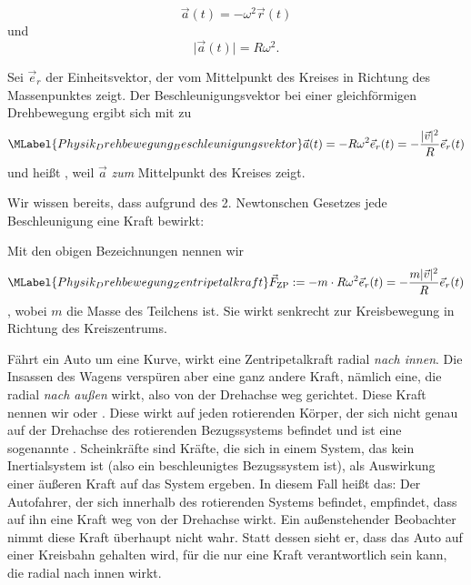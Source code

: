 \begin{MContent}
             $$\vec{a}(t)=-\omega^2\vec{r}(t) 
             $$ und
             $$\vert\vec{a}(t)\vert=R\omega^2. 
             $$
             
             \begin{MInfo}
                Sei $\vec{e}_r$ der Einheitsvektor, der vom Mittelpunkt des Kreises in Richtung des Massenpunktes zeigt. Der Beschleunigungsvektor bei einer gleichf\"ormigen Drehbewegung ergibt sich mit  zu
               \begin{equation}\MLabel{Physik_Drehbewegung_Beschleunigungsvektor}
               \vec{a}(t)=-R\omega^2\vec{e}_r(t)=-\frac{\vert \vec{v}\vert^2}{R}\vec{e}_r(t)
               \end{equation} und hei{\ss}t , weil $\vec{a}$ \emph{zum} Mittelpunkt des Kreises zeigt. 
               \end{MInfo}
               
               Wir wissen bereits, dass aufgrund des 2. Newtonschen Gesetzes jede Beschleunigung eine Kraft bewirkt:
               \begin{MInfo}
                 Mit den obigen Bezeichnungen nennen wir 
                 \begin{equation}\MLabel{Physik_Drehbewegung_Zentripetalkraft}
                 \vec{F}_{\textrm{ZP}}:=-m\cdot R\omega^2\vec{e}_r(t)=-\frac{m\vert \vec{v}\vert^2}{R}\vec{e}_r(t)
                 \end{equation} , wobei $m $ die Masse des Teilchens ist. Sie wirkt senkrecht zur Kreisbewegung in Richtung des Kreiszentrums. 
                 \end{MInfo}
                 F\"ahrt ein Auto um eine Kurve, wirkt eine Zentripetalkraft radial \emph{nach innen}. Die Insassen des Wagens versp\"uren aber eine ganz andere Kraft, n\"amlich eine, die radial \emph{nach au{\ss}en} wirkt, also von der Drehachse weg gerichtet. Diese Kraft nennen wir  oder . Diese wirkt auf jeden rotierenden K\"orper, der sich nicht genau auf der Drehachse des rotierenden Bezugssystems befindet und ist eine sogenannte . Scheinkr\"afte sind Kr\"afte, die sich in einem System, das kein Inertialsystem ist (also ein beschleunigtes Bezugssystem ist), als Auswirkung einer \"au{\ss}eren Kraft auf das System ergeben. In diesem Fall hei{\ss}t das: Der Autofahrer, der sich innerhalb des rotierenden Systems befindet, empfindet, dass auf ihn eine Kraft weg von der Drehachse wirkt. Ein au{\ss}enstehender Beobachter nimmt diese Kraft \"uberhaupt nicht wahr. Statt dessen sieht er, dass das Auto auf einer Kreisbahn gehalten wird, f\"ur die nur eine Kraft verantwortlich sein kann, die radial nach innen wirkt.
                 
               \end{MContent}
             
